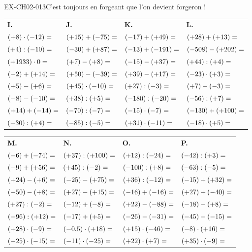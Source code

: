 \documentclass[12pt, a4paper]{article}
\begin{document}
\begin{exercice}{EX-CH02-013}{C'est toujours en forgeant que l'on devient forgeron !}
{\bigskip
\begin{tabularx}{\linewidth}{*{4}{X}}
\textbf{I.} & \textbf{J.} & \textbf{K.} & \textbf{L.} \\
$(+8)\cdot(-12)= \dotfill$  & $(+15)+(-75)= \dotfill$   & $(-17)+(+49)= \dotfill$     & $(+28)+(+13)= \dotfill$      \\
$(+4):(-10)= \dotfill$      & $(-30)+(+87)= \dotfill$   & $(-13)+(-191)= \dotfill$    & $(-508)-(+202)= \dotfill$    \\
$(+1933)\cdot 0= \dotfill$  & $(+7)-(+8)= \dotfill$     & $(-15)-(+37)= \dotfill$     & $(+44):(+4)= \dotfill$       \\
$(-2)+(+14)= \dotfill$      & $(+50)-(-39)= \dotfill$   & $(+39)-(+17)= \dotfill$     & $(-23)\cdot(+3)= \dotfill$   \\
$(+5)-(+6)= \dotfill$       & $(+45)\cdot(-10)= \dotfill$ & $(+27):(-3)= \dotfill$    & $(+7)-(-3)= \dotfill$        \\
$(-8)-(-10)= \dotfill$      & $(+38):(+5)= \dotfill$    & $(-180):(-20)= \dotfill$    & $(-56):(+7)= \dotfill$       \\
$(+14)+(-14)= \dotfill$     & $(-70):(-7)= \dotfill$    & $(-15)\cdot(-7)= \dotfill$  & $(-130)+(+100)= \dotfill$    \\
$(-30):(+4)= \dotfill$      & $(-85):(-5)= \dotfill$    & $(+31)\cdot(-11)= \dotfill$ & $(-18)\cdot(+5)= \dotfill$   \\
\end{tabularx}

\bigskip
\begin{tabularx}{\linewidth}{*{4}{X}}
\textbf{M.} & \textbf{N.} & \textbf{O.} & \textbf{P.} \\
$(-6)+(-74)= \dotfill$      & $(+37):(+100)= \dotfill$  & $(+12):(-24)= \dotfill$     & $(-42):(+3)= \dotfill$       \\
$(-9)+(+56)= \dotfill$      & $(+45):(-2)= \dotfill$    & $(-100):(+8)= \dotfill$     & $(-63):(-5)= \dotfill$       \\
$(+24)-(+6)= \dotfill$      & $(-25)-(+75)= \dotfill$   & $(+36):(-12)= \dotfill$     & $(-15)+(+32)= \dotfill$      \\
$(-50)-(+8)= \dotfill$      & $(+27)-(+15)= \dotfill$   & $(-16)+(-16)= \dotfill$     & $(+27)+(-40)= \dotfill$      \\
$(+27):(-2)= \dotfill$      & $(-12)+(-8)= \dotfill$    & $(+22)-(-88)= \dotfill$     & $(-18)-(+8)= \dotfill$       \\
$(-96):(+12)= \dotfill$     & $(-17)+(+5)= \dotfill$    & $(-26)-(-31)= \dotfill$     & $(-45)-(-15)= \dotfill$      \\
$(+28)\cdot(-9)= \dotfill$  & $(-0{,}5)\cdot(+18)= \dotfill$ & $(+15)\cdot(-46)= \dotfill$ & $(-8)\cdot(+16)= \dotfill$ \\
$(-25)\cdot(-15)= \dotfill$ & $(-11)\cdot(-25)= \dotfill$ & $(+22)\cdot(+7)= \dotfill$ & $(+35)\cdot(-9)= \dotfill$   \\
\end{tabularx}
}
\end{exercice}
\end{document}
